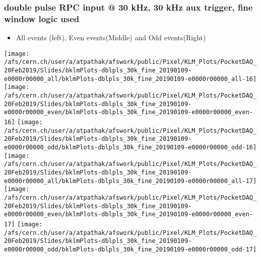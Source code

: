 \documentclass{beamer}
\begin{document}
\begin{frame}
\frametitle{\small double pulse RPC input @ 30 kHz, 30 kHz aux trigger, fine window logic used}
\vspace*{.05cm}
\begin{center}
 \begin{itemize}
\item { \small All events (left), Even events(Middle) and Odd events(Right)}
\end{itemize}
\begin{normalsize}

\vspace*{-.2cm}
\begin{center}

\texttt{[image: /afs/cern.ch/user/a/atpathak/afswork/public/Pixel/KLM\_Plots/PocketDAQ\_20Feb2019/Slides/bklmPlots-dblpls\_30k\_fine\_20190109-e0000r00000\_all/bklmPlots-dblpls\_30k\_fine\_20190109-e0000r00000\_all-16]}
\texttt{[image: /afs/cern.ch/user/a/atpathak/afswork/public/Pixel/KLM\_Plots/PocketDAQ\_20Feb2019/Slides/bklmPlots-dblpls\_30k\_fine\_20190109-e0000r00000\_even/bklmPlots-dblpls\_30k\_fine\_20190109-e0000r00000\_even-16]}
\texttt{[image: /afs/cern.ch/user/a/atpathak/afswork/public/Pixel/KLM\_Plots/PocketDAQ\_20Feb2019/Slides/bklmPlots-dblpls\_30k\_fine\_20190109-e0000r00000\_odd/bklmPlots-dblpls\_30k\_fine\_20190109-e0000r00000\_odd-16]} \\

\texttt{[image: /afs/cern.ch/user/a/atpathak/afswork/public/Pixel/KLM\_Plots/PocketDAQ\_20Feb2019/Slides/bklmPlots-dblpls\_30k\_fine\_20190109-e0000r00000\_all/bklmPlots-dblpls\_30k\_fine\_20190109-e0000r00000\_all-17]}
\texttt{[image: /afs/cern.ch/user/a/atpathak/afswork/public/Pixel/KLM\_Plots/PocketDAQ\_20Feb2019/Slides/bklmPlots-dblpls\_30k\_fine\_20190109-e0000r00000\_even/bklmPlots-dblpls\_30k\_fine\_20190109-e0000r00000\_even-17]}
\texttt{[image: /afs/cern.ch/user/a/atpathak/afswork/public/Pixel/KLM\_Plots/PocketDAQ\_20Feb2019/Slides/bklmPlots-dblpls\_30k\_fine\_20190109-e0000r00000\_odd/bklmPlots-dblpls\_30k\_fine\_20190109-e0000r00000\_odd-17]} \\

\end{center}
\end{normalsize}
\end{center}
\end{frame}
\end{document}
